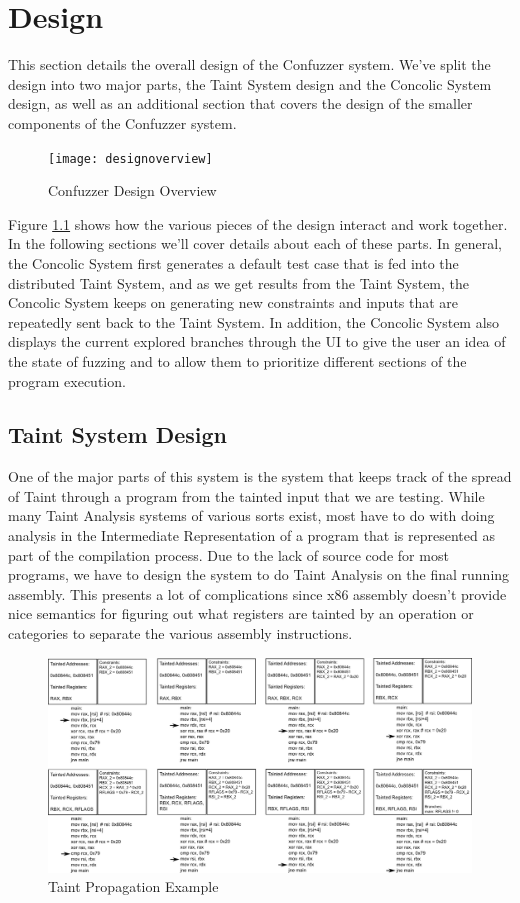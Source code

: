 \chapter{Design}
This section details the overall design of the Confuzzer system. We've split the
design into two major parts, the Taint System design and the Concolic System
design, as well as an additional section that covers the design of the smaller
components of the Confuzzer system.

\begin{figure}[htbp]
 \centering
 \texttt{[image: designoverview]}
 \caption{Confuzzer Design Overview}
 \label{figure:designoverview}
\end{figure}

Figure \ref{figure:designoverview} shows how the various pieces of the design
interact and work together. In the following sections we'll cover details about
each of these parts. In general, the Concolic System first generates a default
test case that is fed into the distributed Taint System, and as we get results
from the Taint System, the Concolic System keeps on generating new constraints
and inputs that are repeatedly sent back to the Taint System. In addition, the
Concolic System also displays the current explored branches through the UI to
give the user an idea of the state of fuzzing and to allow them to prioritize
different sections of the program execution.

\section{Taint System Design}
One of the major parts of this system is the system that keeps track of the
spread of Taint through a program from the tainted input that we are
testing. While many Taint Analysis systems of various sorts exist, most have to
do with doing analysis in the Intermediate Representation of a program that is
represented as part of the compilation process. Due to the lack of source code
for most programs, we have to design the system to do Taint Analysis on the
final running assembly. This presents a lot of complications since x86 assembly
doesn't provide nice semantics for figuring out what registers are tainted by an
operation or categories to separate the various assembly instructions.

\begin{figure}[htbp]
 \centering
 \includegraphics{taintprop}
 \caption{Taint Propagation Example}
 \label{figure:taintprop}
\end{figure}

